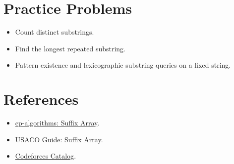 \section*{Practice Problems}

\begin{itemize}
  \item Count distinct substrings.
  \item Find the longest repeated substring.
  \item Pattern existence and lexicographic substring queries on a fixed string.
\end{itemize}

\section*{References}

\begin{itemize}
  \item \href{https://cp-algorithms.com/string/suffix-array.html}{cp-algorithms: Suffix Array}.
  \item \href{https://usaco.guide/adv/suffix-array?lang=cpp}{USACO Guide: Suffix Array}.
  \item \href{https://codeforces.com/catalog}{Codeforces Catalog}.
\end{itemize}
